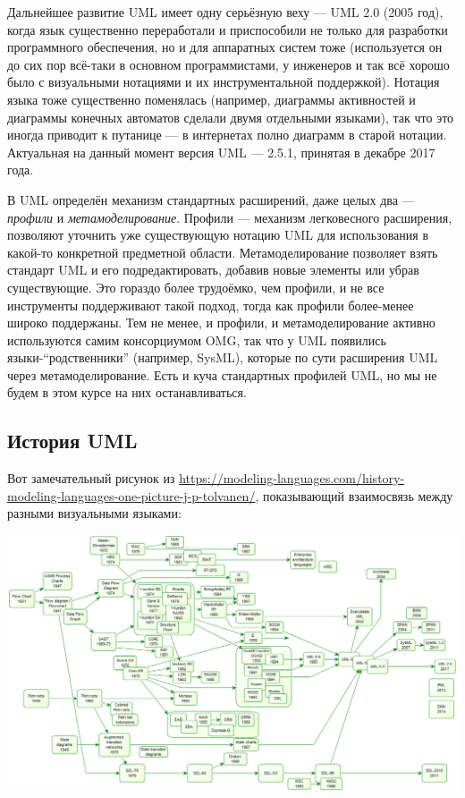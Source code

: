 \documentclass[a5paper]{article}
\begin{document}
Дальнейшее развитие UML имеет одну серьёзную веху --- UML 2.0 (2005 год), когда язык существенно переработали и приспособили не только для разработки программного обеспечения, но и для аппаратных систем тоже (используется он до сих пор всё-таки в основном программистами, у инженеров и так всё хорошо было с визуальными нотациями и их инструментальной поддержкой). Нотация языка тоже существенно поменялась (например, диаграммы активностей и диаграммы конечных автоматов сделали двумя отдельными языками), так что это иногда приводит к путанице --- в интернетах полно диаграмм в старой нотации. Актуальная на данный момент версия UML --- 2.5.1, принятая в декабре 2017 года.

В UML определён механизм стандартных расширений, даже целых два --- \textit{профили} и \textit{метамоделирование}. Профили --- механизм легковесного расширения, позволяют уточнить уже существующую нотацию UML для использования в какой-то конкретной предметной области. Метамоделирование позволяет взять стандарт UML и его подредактировать, добавив новые элементы или убрав существующие. Это гораздо более трудоёмко, чем профили, и не все инструменты поддерживают такой подход, тогда как профили более-менее широко поддержаны. Тем не менее, и профили, и метамоделирование активно используются самим консорциумом OMG, так что у UML появились языки-``родственники'' (например, SysML), которые по сути расширения UML через метамоделирование. Есть и куча стандартных профилей UML, но мы не будем в этом курсе на них останавливаться.

\subsection{История UML}

Вот замечательный рисунок из \url{https://modeling-languages.com/history-modeling-languages-one-picture-j-p-tolvanen/}, показывающий взаимосвязь между разными визуальными языками:

\begin{center}
	\includegraphics[width=\textwidth]{umlHistory.png}
\end{center}
\end{document}

